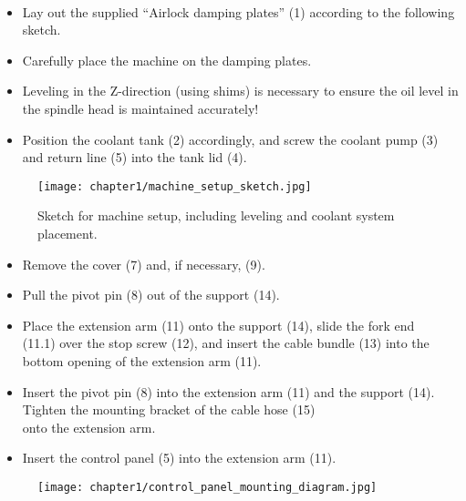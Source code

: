 \\

\newpage
{}

\begin{itemize}
    \item Lay out the supplied \enquote{Airlock damping plates} (1) according to the following sketch.
    \item Carefully place the machine on the damping plates.
    \item Leveling in the Z-direction (using shims) is necessary to ensure the oil level in the spindle head is maintained accurately!
    \item Position the coolant tank (2) accordingly, and screw the coolant pump (3) and return line (5) into the tank lid (4).
\end{itemize}

\vspace{1cm}

\begin{figure}[h!]
    \centering
    \texttt{[image: chapter1/machine\_setup\_sketch.jpg]}
    \caption{Sketch for machine setup, including leveling and coolant system placement.}
    \label{fig:machine_setup_sketch}
\end{figure}


\begin{itemize}
    \item Remove the cover (7) and, if necessary, (9).
    \item Pull the pivot pin (8) out of the support (14).
    \item Place the extension arm (11) onto the support (14), slide the fork end \\(11.1) over the stop screw (12), and insert the cable bundle (13) into the bottom opening of the extension arm (11).
    \item Insert the pivot pin (8) into the extension arm (11) and the support (14). Tighten the mounting bracket of the cable hose (15) \\onto the extension arm.
    \item Insert the control panel (5) into the extension arm (11).
\end{itemize}

\begin{figure}[h!]
    \centering
    \texttt{[image: chapter1/control\_panel\_mounting\_diagram.jpg]}
    \caption{}
    \label{fig:control_panel_mounting}
\end{figure}

